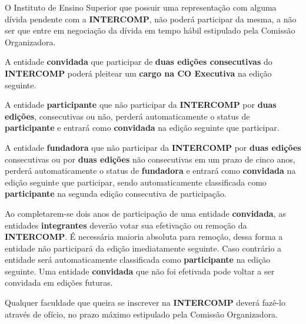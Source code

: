 \begin{article}
	\begin{xparagraph}
		O Instituto de Ensino Superior que possuir uma representação com alguma dívida pendente com a \textbf{INTERCOMP}, não poderá participar da mesma, a não ser que entre em negociação da dívida em tempo hábil estipulado pela Comissão Organizadora.
	\end{xparagraph}

	\begin{xparagraph}
		A entidade \textbf{convidada} que participar de \textbf{duas edições consecutivas} do \textbf{INTERCOMP} poderá pleitear um \textbf{cargo na CO Executiva} na edição seguinte.
	\end{xparagraph}

	\begin{xparagraph}
		A entidade \textbf{participante} que não participar da \textbf{INTERCOMP} por \textbf{duas edições}, consecutivas ou não, perderá automaticamente o status de \textbf{participante} e entrará como \textbf{convidada} na edição seguinte que participar.
	\end{xparagraph}

	\begin{xparagraph}
		A entidade \textbf{fundadora} que não participar da \textbf{INTERCOMP} por \textbf{duas edições} consecutivas ou por \textbf{duas edições} não consecutivas em um prazo de cinco anos, perderá automaticamente o status de \textbf{fundadora} e entrará como \textbf{convidada} na edição seguinte que participar, sendo automaticamente classificada como \textbf{participante} na segunda edição consecutiva de participação.
	\end{xparagraph}
\end{article}

\begin{article}
	Ao completarem-se dois anos de participação de uma entidade \textbf{convidada}, as entidades \textbf{integrantes} deverão votar sua efetivação ou remoção da \textbf{INTERCOMP}. É necessária maioria absoluta para remoção, dessa forma a entidade não participará da edição imediatamente seguinte. Caso contrário a entidade será automaticamente classificada como \textbf{participante} na edição seguinte. Uma entidade \textbf{convidada} que não foi efetivada pode voltar a ser convidada em edições futuras.
\end{article}

\begin{article}
	Qualquer faculdade que queira se inscrever na \textbf{INTERCOMP} deverá fazê-lo através de ofício, no prazo máximo estipulado pela Comissão Organizadora.
\end{article}

